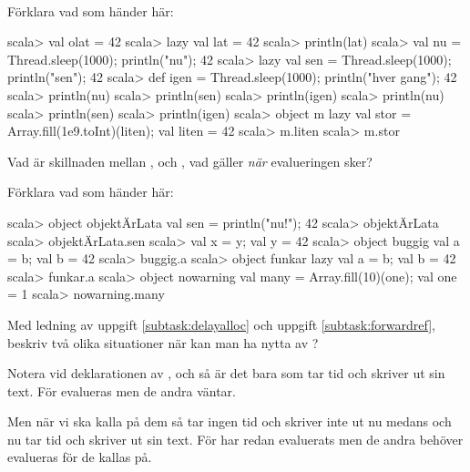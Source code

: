 \QUESTEND









\QUESTBEGIN

\Task  \what~

\Subtask \label{subtask:delayalloc} Förklara vad som händer här:
\begin{REPL}
scala> val olat = 42
scala> lazy val lat = 42
scala> println(lat)
scala> val nu = {Thread.sleep(1000); println("nu"); 42}
scala> lazy val sen = {Thread.sleep(1000); println("sen"); 42}
scala> def igen = {Thread.sleep(1000); println("hver gang"); 42}
scala> println(nu)
scala> println(sen)
scala> println(igen)
scala> println(nu)
scala> println(sen)
scala> println(igen)
scala> object m {lazy val stor = Array.fill(1e9.toInt)(liten); val liten = 42}
scala> m.liten
scala> m.stor
\end{REPL}

\Subtask Vad är skillnaden mellan ,  och , vad gäller \emph{när} evalueringen sker?


\Subtask \label{subtask:forwardref} Förklara vad som händer här:
\begin{REPL}
scala> object objektÄrLata { val sen = { println("nu!"); 42 } }
scala> objektÄrLata
scala> objektÄrLata.sen
scala> {val x = y; val y = 42}
scala> object buggig {val a = b; val b = 42}
scala> buggig.a
scala> object funkar {lazy val a = b; val b = 42}
scala> funkar.a
scala> object nowarning {val many = Array.fill(10)(one); val one = 1}
scala> nowarning.many
\end{REPL}

\Subtask Med ledning av uppgift \ref{subtask:delayalloc} och uppgift \ref{subtask:forwardref}, beskriv två olika situationer när kan man ha nytta av ?


\SOLUTION


\TaskSolved \what


\SubtaskSolved  Notera vid deklarationen av ,  och  så är det bara  som tar tid och skriver ut sin text. För  evalueras men de andra väntar.

Men när vi ska kalla på dem så tar  ingen tid och skriver inte ut nu medans  och  nu tar tid och skriver ut sin text. För  har redan evaluerats men de andra behöver evalueras för de kallas på.


